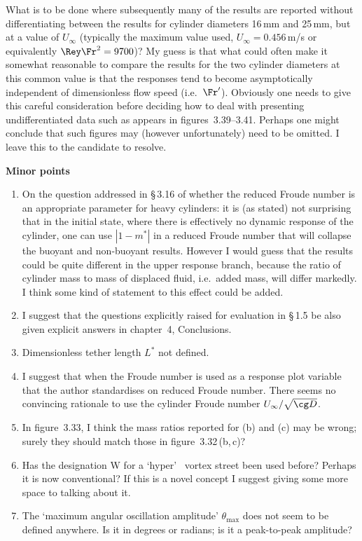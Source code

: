 \documentclass[12pt,twoside]{letter}
\begin{document}
What is to be done where subsequently many of the results are reported
without differentiating between the results for cylinder diameters
16\,mm and 25\,mm, but at a value of $U_\infty$ (typically the maximum
value used, $U_\infty=0.456$\,m/s or equivalently $\Rey\Fr^2=9700$)?
My guess is that what could often make it somewhat reasonable to
compare the results for the two cylinder diameters at this common
value is that the responses tend to become asymptotically independent
of dimensionless flow speed (i.e.\ $\Fr^\prime$).  Obviously one needs
to give this careful consideration before deciding how to deal with
presenting undifferentiated data such as appears in
figures~3.39--3.41. Perhaps one might conclude that such figures may
(however unfortunately) need to be omitted. I leave this to the
candidate to resolve.

\textbf{Minor points}
\begin{enumerate}
\item
On the question addressed in \S\,3.16 of whether the reduced Froude
number is an appropriate parameter for heavy cylinders: it is (as
stated) not surprising that in the initial state, where there is
effectively no dynamic response of the cylinder, one can use
$|1-m^\ast|$ in a reduced Froude number that will collapse the buoyant
and non-buoyant results.  However I would guess that the results could
be quite different in the upper response branch, because the ratio of
cylinder mass to mass of displaced fluid, i.e.\ added mass, will
differ markedly. I think some kind of statement to this effect could
be added.
\item
I suggest that the questions explicitly raised for evaluation in
\S\,1.5 be also given explicit answers in chapter~4, Conclusions.
\item
Dimensionless tether length $L^\ast$ not defined.
\item
I suggest that when the Froude number is used as a response plot
variable that the author standardises on reduced Froude number. There
seems no convincing rationale to use the cylinder Froude number
$U_\infty/\sqrt{\cg D}$.
\item
In figure~3.33, I think the mass ratios reported for (b) and (c) may
be wrong; surely they should match those in figure~3.32\,(b,\,c)?
\item
Has the designation W for a `hyper' \Ka\ vortex street been used
before?  Perhaps it is now conventional?  If this is a novel concept I
suggest giving some more space to talking about it.
\item
The `maximum angular oscillation amplitude' $\theta_{\max}$ does not
seem to be defined anywhere.  Is it in degrees or radians; is it a
peak-to-peak amplitude?
\end{enumerate}
\end{document}
